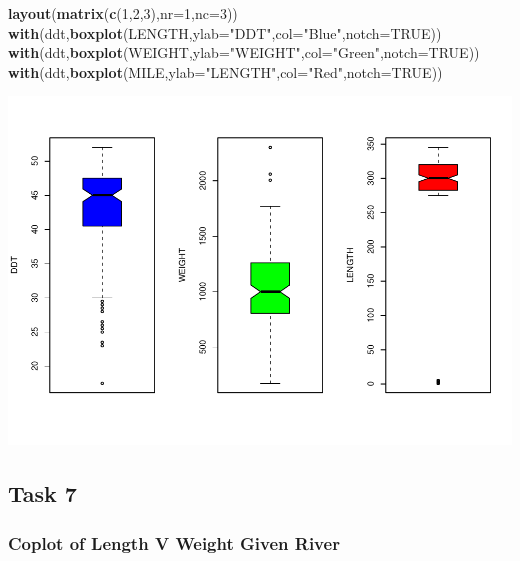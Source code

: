 \documentclass[]{article}
\newenvironment{Shaded}{\begin{snugshade}}{\end{snugshade}}
\newcommand{\KeywordTok}[1]{\textcolor[rgb]{0.13,0.29,0.53}{\textbf{#1}}}
\newcommand{\DataTypeTok}[1]{\textcolor[rgb]{0.13,0.29,0.53}{#1}}
\newcommand{\DecValTok}[1]{\textcolor[rgb]{0.00,0.00,0.81}{#1}}
\newcommand{\StringTok}[1]{\textcolor[rgb]{0.31,0.60,0.02}{#1}}
\newcommand{\OtherTok}[1]{\textcolor[rgb]{0.56,0.35,0.01}{#1}}
\newcommand{\NormalTok}[1]{#1}
\begin{document}
\begin{Shaded}
\begin{Highlighting}[]
\KeywordTok{layout}\NormalTok{(}\KeywordTok{matrix}\NormalTok{(}\KeywordTok{c}\NormalTok{(}\DecValTok{1}\NormalTok{,}\DecValTok{2}\NormalTok{,}\DecValTok{3}\NormalTok{),}\DataTypeTok{nr=}\DecValTok{1}\NormalTok{,}\DataTypeTok{nc=}\DecValTok{3}\NormalTok{))}
\KeywordTok{with}\NormalTok{(ddt,}\KeywordTok{boxplot}\NormalTok{(LENGTH,}\DataTypeTok{ylab=}\StringTok{"DDT"}\NormalTok{,}\DataTypeTok{col=}\StringTok{"Blue"}\NormalTok{,}\DataTypeTok{notch=}\OtherTok{TRUE}\NormalTok{))}
\KeywordTok{with}\NormalTok{(ddt,}\KeywordTok{boxplot}\NormalTok{(WEIGHT,}\DataTypeTok{ylab=}\StringTok{"WEIGHT"}\NormalTok{,}\DataTypeTok{col=}\StringTok{"Green"}\NormalTok{,}\DataTypeTok{notch=}\OtherTok{TRUE}\NormalTok{))}
\KeywordTok{with}\NormalTok{(ddt,}\KeywordTok{boxplot}\NormalTok{(MILE,}\DataTypeTok{ylab=}\StringTok{"LENGTH"}\NormalTok{,}\DataTypeTok{col=}\StringTok{"Red"}\NormalTok{,}\DataTypeTok{notch=}\OtherTok{TRUE}\NormalTok{))}
\end{Highlighting}
\end{Shaded}

\includegraphics{./tex2pdf.8500/a3bacb5cbcb7dd6a84f7b2b31506186c6665033d.pdf}

\subsection{Task 7}\label{task-7}

\subsubsection{Coplot of Length V Weight Given
River}\label{coplot-of-length-v-weight-given-river}
\end{document}
